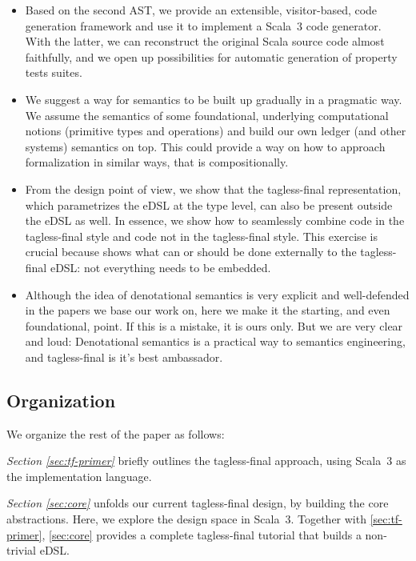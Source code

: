 \documentclass[11pt]{article}
\begin{document}
\begin{itemize}
	\item Based on the second AST, we provide an extensible, visitor-based, code generation framework and use it to implement a Scala~3 code generator. With the latter, we can reconstruct the original Scala source code almost faithfully, and we open up possibilities for automatic generation of property tests suites.
		
	\item We suggest a way for semantics to be built up gradually in a pragmatic way. We assume the semantics of some foundational, underlying computational notions (primitive types and operations) and build our own ledger (and other systems) semantics on top. This could provide a way on how to approach formalization in similar ways, that is compositionally.
		
	  \item From the design point of view, we show that the tagless-final representation, which parametrizes the eDSL at the type level, can also be present outside the eDSL as well. In essence, we show how to seamlessly combine code in the tagless-final style and code not in the tagless-final style. This exercise is crucial because shows what can or should be done externally to the tagless-final eDSL: not everything needs to be embedded.
	  
	  \item Although the idea of denotational semantics is very explicit and well-defended in the papers we base our work on, here we make it the starting, and even foundational, point. If this is a mistake, it is ours only. But we are very clear and loud: Denotational semantics is a practical way to semantics engineering, and tagless-final is it's best ambassador.
\end{itemize}

\subsection{Organization}

We organize the rest of the paper as follows:

\textit{Section \ref{sec:tf-primer}} briefly outlines the tagless-final approach, using Scala~3 as the implementation language.

\textit{Section \ref{sec:core}} unfolds our current tagless-final design, by building the core abstractions. Here, we explore the design space in Scala~3. Together with \autoref{sec:tf-primer}, \autoref{sec:core} provides a complete tagless-final tutorial that builds a non-trivial eDSL.
\end{document}
